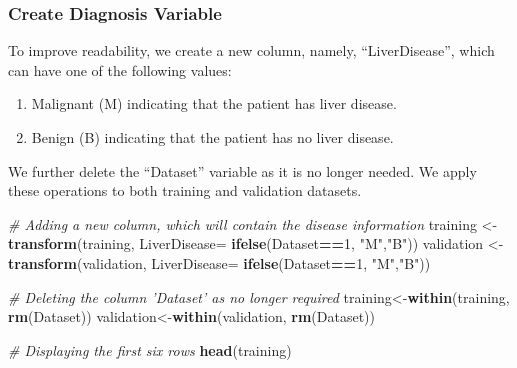 \documentclass[]{article}
\newenvironment{Shaded}{\begin{snugshade}}{\end{snugshade}}
\newcommand{\CommentTok}[1]{\textcolor[rgb]{0.56,0.35,0.01}{\textit{#1}}}
\newcommand{\DataTypeTok}[1]{\textcolor[rgb]{0.13,0.29,0.53}{#1}}
\newcommand{\DecValTok}[1]{\textcolor[rgb]{0.00,0.00,0.81}{#1}}
\newcommand{\KeywordTok}[1]{\textcolor[rgb]{0.13,0.29,0.53}{\textbf{#1}}}
\newcommand{\NormalTok}[1]{#1}
\newcommand{\OperatorTok}[1]{\textcolor[rgb]{0.81,0.36,0.00}{\textbf{#1}}}
\newcommand{\OtherTok}[1]{\textcolor[rgb]{0.56,0.35,0.01}{#1}}
\newcommand{\StringTok}[1]{\textcolor[rgb]{0.31,0.60,0.02}{#1}}
\begin{document}
\begin{Shaded}
\end{Shaded}

\subsubsection{Create Diagnosis Variable}

To improve readability, we create a new column, namely,
``LiverDisease'', which can have one of the following values:

\begin{enumerate}
\item Malignant (M) indicating that the patient has liver disease.
\item Benign (B) indicating that the patient has no liver disease.
\end{enumerate}

We further delete the ``Dataset'' variable as it is no longer needed. We
apply these operations to both training and validation datasets.

\begin{Shaded}
\begin{Highlighting}[]
\CommentTok{# Adding a new column, which will contain the disease information}
\NormalTok{training <-}\StringTok{ }\KeywordTok{transform}\NormalTok{(training, }\DataTypeTok{LiverDisease=} \KeywordTok{ifelse}\NormalTok{(Dataset}\OperatorTok{==}\DecValTok{1}\NormalTok{, }\StringTok{"M"}\NormalTok{,}\StringTok{"B"}\NormalTok{))}
\NormalTok{validation <-}\StringTok{ }\KeywordTok{transform}\NormalTok{(validation, }\DataTypeTok{LiverDisease=} \KeywordTok{ifelse}\NormalTok{(Dataset}\OperatorTok{==}\DecValTok{1}\NormalTok{, }\StringTok{"M"}\NormalTok{,}\StringTok{"B"}\NormalTok{))}

\CommentTok{# Deleting the column 'Dataset' as no longer required}
\NormalTok{training<-}\KeywordTok{within}\NormalTok{(training, }\KeywordTok{rm}\NormalTok{(Dataset))}
\NormalTok{validation<-}\KeywordTok{within}\NormalTok{(validation, }\KeywordTok{rm}\NormalTok{(Dataset))}

\CommentTok{# Displaying the first six rows}
\KeywordTok{head}\NormalTok{(training)}
\end{Highlighting}
\end{Shaded}
\end{document}
